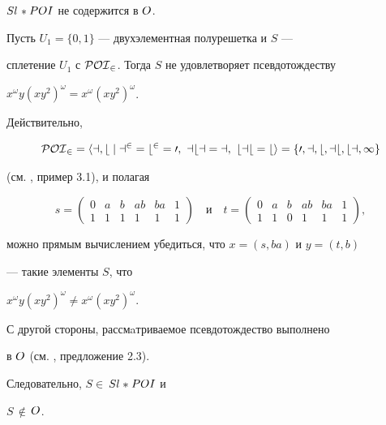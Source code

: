 $\boldmath{Sl}$\,${*}$\,$\boldmath POI$ не содержится в $\boldmath{O}$.





\begin{exams} 


Пусть $U_1=\{0,1\}$ --- двухэлементная полурешетка и $S$ ---


сплетение $U_1$ с $\cal{POI}_2$. Тогда $S$ не удовлетворяет псевдотождеству


$x^{\omega}y(xy^2)^{\omega}=x^{\omega}(xy^2)^{\omega}$.


Действительно,


$$


\poi_2=\langle a,b\mid a^2=b^2=0,\ aba=a,\ bab=b\rangle=\{0,a,b,ab,ba,1\}


$$


(см. \cite{VHF3}, пример 3.1), и полагая


$$


s=


\begin{pmatrix}


0&a&b&ab&ba&1\\ 1&1&1&1&1&1


\end{pmatrix} \quad \text{и} \quad


t=


\begin{pmatrix}


0&a&b&ab&ba&1\\ 1&1&0&1&1&1


\end{pmatrix}


,


$$


можно прямым вычислением убедиться, что $x=(s,ba)$ и $y=(t,b)$


--- такие элементы $S$, что


$x^{\omega}y(xy^2)^{\omega}\neq x^{\omega}(xy^2)^{\omega}$.


С другой стороны, рассмaтриваемое псевдотождество выполнено


в $\boldmath{O}$ (см. \cite{A-V}, предложение 2.3).


Следовательно, $S\in$\,$\boldmath{Sl}$\,${*} $\,$\boldmath POI$ и


$S$\,$\notin$\,$\boldmath{O}$.


\end{exams}





